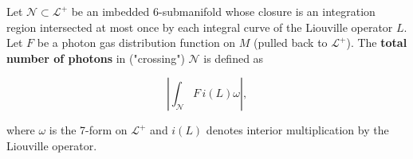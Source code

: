Let $\mathcal{N} \subset \mathcal{L}^+$ be an imbedded 6-submanifold whose closure is an integration region intersected at most once by each integral curve of the Liouville operator $L$. Let $F$ be a photon gas distribution function on $M$ (pulled back to $\mathcal{L}^+$). The \textbf{total number of photons} in ("crossing") $\mathcal{N}$ is defined as

$$\left| \int_{\mathcal{N}} F \, i(L) \omega \right|,$$

where $\omega$ is the 7-form on $\mathcal{L}^+$ and $i(L)$ denotes interior multiplication by the Liouville operator.
